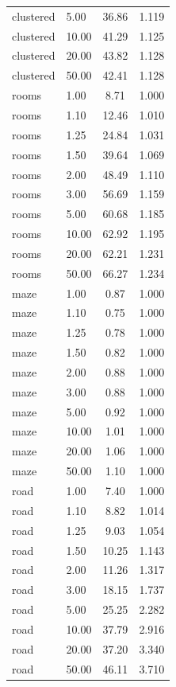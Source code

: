 \begin{longtable}{llcc}
clustered & 5.00 & 36.86 & 1.119\\
clustered & 10.00 & 41.29 & 1.125\\
clustered & 20.00 & 43.82 & 1.128\\
clustered & 50.00 & 42.41 & 1.128\\
rooms & 1.00 & 8.71 & 1.000\\
rooms & 1.10 & 12.46 & 1.010\\
rooms & 1.25 & 24.84 & 1.031\\
rooms & 1.50 & 39.64 & 1.069\\
rooms & 2.00 & 48.49 & 1.110\\
rooms & 3.00 & 56.69 & 1.159\\
rooms & 5.00 & 60.68 & 1.185\\
rooms & 10.00 & 62.92 & 1.195\\
rooms & 20.00 & 62.21 & 1.231\\
rooms & 50.00 & 66.27 & 1.234\\
maze & 1.00 & 0.87 & 1.000\\
maze & 1.10 & 0.75 & 1.000\\
maze & 1.25 & 0.78 & 1.000\\
maze & 1.50 & 0.82 & 1.000\\
maze & 2.00 & 0.88 & 1.000\\
maze & 3.00 & 0.88 & 1.000\\
maze & 5.00 & 0.92 & 1.000\\
maze & 10.00 & 1.01 & 1.000\\
maze & 20.00 & 1.06 & 1.000\\
maze & 50.00 & 1.10 & 1.000\\
road & 1.00 & 7.40 & 1.000\\
road & 1.10 & 8.82 & 1.014\\
road & 1.25 & 9.03 & 1.054\\
road & 1.50 & 10.25 & 1.143\\
road & 2.00 & 11.26 & 1.317\\
road & 3.00 & 18.15 & 1.737\\
road & 5.00 & 25.25 & 2.282\\
road & 10.00 & 37.79 & 2.916\\
road & 20.00 & 37.20 & 3.340\\
road & 50.00 & 46.11 & 3.710\\
\bottomrule
\end{longtable}

\twocolumn
